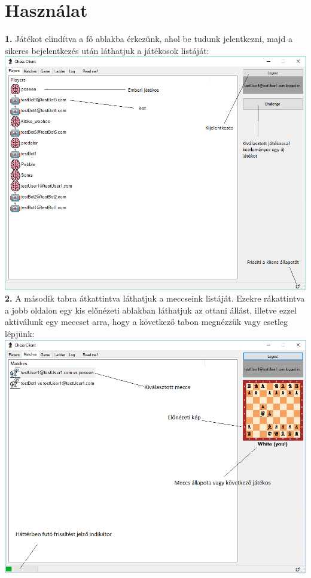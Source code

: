 \documentclass[twoside, a4paper, 12pt]{book}
\begin{document}
\section{Használat}
\noindent \textbf{1.} Játékot elindítva a fő ablakba érkezünk, ahol be tudunk jelentkezni, majd a sikeres bejelentkezés után láthatjuk a játékosok listáját: \\
\includegraphics[width=1.0\textwidth]{img/chessClient_1.png} \\
\newpage
\noindent \textbf{2.} A második tabra átkattintva láthatjuk a meccseink listáját. Ezekre rákattintva a jobb oldalon egy kis előnézeti ablakban láthatjuk az ottani állást, illetve ezzel aktiválunk egy meccset arra, hogy a következő tabon megnézzük vagy esetleg lépjünk: \\
\includegraphics[width=1.0\textwidth]{img/chessClient_2.png} \\
\end{document}
